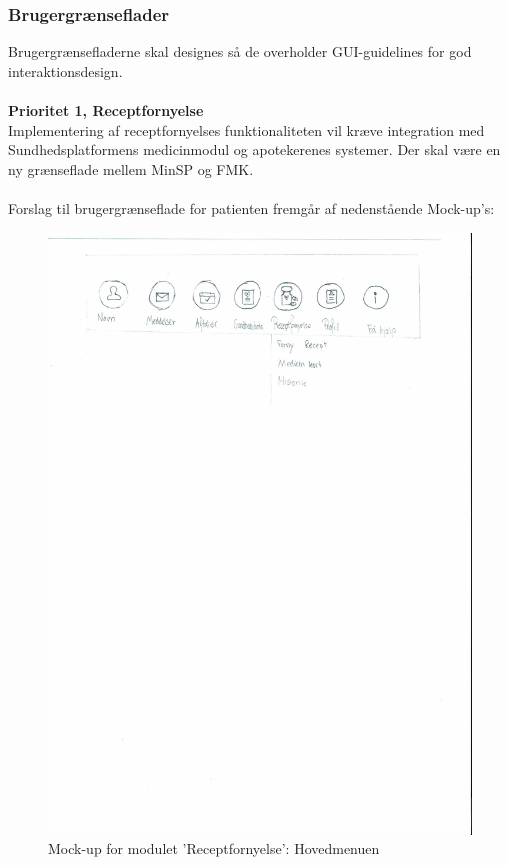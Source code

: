 \subsubsection{Brugergrænseflader} %
Brugergrænsefladerne skal designes så de overholder GUI-guidelines for god interaktionsdesign. %
\\\\
\textbf{Prioritet 1, Receptfornyelse} \\
Implementering af receptfornyelses funktionaliteten vil kræve integration med Sundhedsplatformens medicinmodul og apotekerenes systemer. 
Der skal være en ny grænseflade mellem MinSP og FMK.\\\\
Forslag til brugergrænseflade for patienten fremgår af nedenstående Mock-up's:\\
\begin{figure}[H]
	\centering
	\includegraphics[angle=0, width=\linewidth]{Materials/FornyRecept_Hovedmenu.pdf}
	\caption{Mock-up for modulet 'Receptfornyelse': Hovedmenuen}
	\label{fig:Mock-Up1}
\end{figure}
